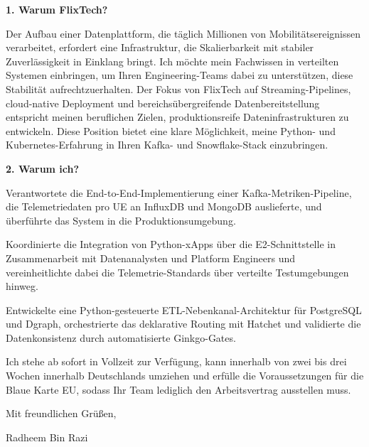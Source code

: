 \documentclass[11pt,a4paper]{coverletter}
\begin{document}
\vspace{8pt}\noindent\textbf{1. Warum FlixTech?}\par\vspace{3pt}

Der Aufbau einer Datenplattform, die täglich Millionen von Mobilitätsereignissen verarbeitet, erfordert eine Infrastruktur, die Skalierbarkeit mit stabiler Zuverlässigkeit in Einklang bringt. Ich möchte mein Fachwissen in verteilten Systemen einbringen, um Ihren Engineering-Teams dabei zu unterstützen, diese Stabilität aufrechtzuerhalten. Der Fokus von FlixTech auf Streaming-Pipelines, cloud-native Deployment und bereichsübergreifende Datenbereitstellung entspricht meinen beruflichen Zielen, produktionsreife Dateninfrastrukturen zu entwickeln. Diese Position bietet eine klare Möglichkeit, meine Python- und Kubernetes-Erfahrung in Ihren Kafka- und Snowflake-Stack einzubringen.

\vspace{8pt}\noindent\textbf{2. Warum ich?}\par\vspace{3pt}

\bullets

  \item Verantwortete die End-to-End-Implementierung einer Kafka-Metriken-Pipeline, die Telemetriedaten pro UE an InfluxDB und MongoDB auslieferte, und überführte das System in die Produktionsumgebung.

  \item Koordinierte die Integration von Python-xApps über die E2-Schnittstelle in Zusammenarbeit mit Datenanalysten und Platform Engineers und vereinheitlichte dabei die Telemetrie-Standards über verteilte Testumgebungen hinweg.

  \item Entwickelte eine Python-gesteuerte ETL-Nebenkanal-Architektur für PostgreSQL und Dgraph, orchestrierte das deklarative Routing mit Hatchet und validierte die Datenkonsistenz durch automatisierte Ginkgo-Gates.

\bulletsend

Ich stehe ab sofort in Vollzeit zur Verfügung, kann innerhalb von zwei bis drei Wochen innerhalb Deutschlands umziehen und erfülle die Voraussetzungen für die Blaue Karte EU, sodass Ihr Team lediglich den Arbeitsvertrag ausstellen muss.

\closing{Mit freundlichen Grüßen,}{Radheem Bin Razi}
\end{document}
